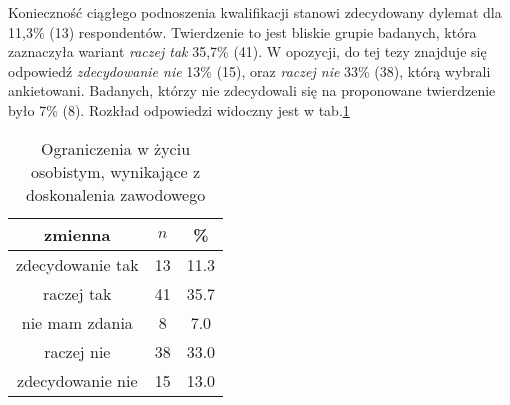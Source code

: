 

 Konieczność ciągłego podnoszenia kwalifikacji stanowi zdecydowany dylemat dla 11,3\% (13) respondentów. Twierdzenie to jest bliskie grupie badanych, która zaznaczyła wariant \textit{raczej tak} 35,7\% (41). W opozycji, do tej tezy znajduje się odpowiedź \textit{zdecydowanie nie} 13\% (15), oraz \textit{raczej nie} 33\% (38), którą wybrali ankietowani. Badanych, którzy nie zdecydowali się na proponowane twierdzenie było 7\% (8). Rozkład odpowiedzi widoczny jest w tab.\ref{tab:Q14}

\begin{table}[H]
\caption{Ograniczenia w życiu osobistym, wynikające z doskonalenia zawodowego}
\centering
\begin{tabular}{ | c | c | c |}
\hline
zmienna & $n$ & \% \\
\hline
zdecydowanie tak  &  13  & 11.3 \\
\hline
raczej tak  &  41  & 35.7 \\
\hline
nie mam zdania  &  8  & 7.0 \\
\hline
raczej nie  &  38  & 33.0\\
\hline
zdecydowanie nie  &  15  & 13.0\\
\hline
\end{tabular}
\label{tab:Q14}
\end{table}
